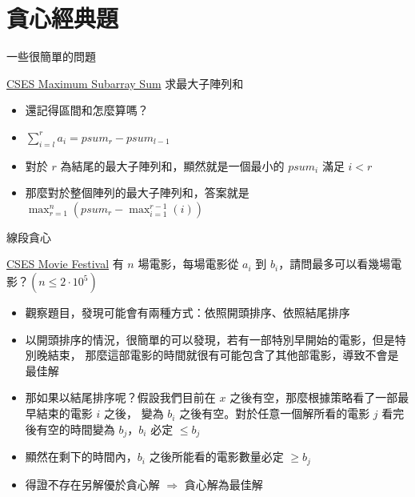 \documentclass[aspectratio=169]{beamer}
\begin{document}
    \section{貪心經典題}

    \begin{frame}{一些很簡單的問題}
        \begin{block}{\href{https://cses.fi/problemset/task/1643}{CSES Maximum Subarray Sum}}
            求最大子陣列和
        \end{block}

        \begin{itemize}
            \item<1-> 還記得區間和怎麼算嗎？
            \item<2-> $\displaystyle\sum_{i = l}^{r}{a_i} = psum_{r} - psum_{l - 1}$ 
            \item<3-> 對於 $r$ 為結尾的最大子陣列和，顯然就是一個最小的 $psum_{i}$ 滿足 $i < r$
            \item<4-> 那麼對於整個陣列的最大子陣列和，答案就是 
            $\displaystyle\max_{r = 1}^{n}(psum_{r} - \max_{i = 1}^{r - 1}(i))$
        \end{itemize}
    \end{frame}

    \begin{frame}{線段貪心}
        \begin{block}{\href{https://cses.fi/problemset/task/1629}{CSES Movie Festival}}
            有 $n$ 場電影，每場電影從 $a_i$ 到 $b_i$，請問最多可以看幾場電影？$(n \le 2 \cdot 10^5)$
        \end{block}

        \begin{itemize}
            \item<1-> 觀察題目，發現可能會有兩種方式：依照開頭排序、依照結尾排序
            \item<2-> 以開頭排序的情況，很簡單的可以發現，若有一部特別早開始的電影，但是特別晚結束，
            那麼這部電影的時間就很有可能包含了其他部電影，導致不會是最佳解
            \item<3-> 那如果以結尾排序呢？假設我們目前在 $x$ 之後有空，那麼根據策略看了一部最早結束的電影 $i$ 之後，
            變為 $b_i$ 之後有空。對於任意一個解所看的電影 $j$ 看完後有空的時間變為 $b_j$，$b_i$ 必定 $\le b_j$
            \item<4-> 顯然在剩下的時間內，$b_i$ 之後所能看的電影數量必定 $\ge b_j$
            \item<5-> 得證不存在另解優於貪心解 $\Rightarrow$ 貪心解為最佳解
        \end{itemize}
    \end{frame}
\end{document}
